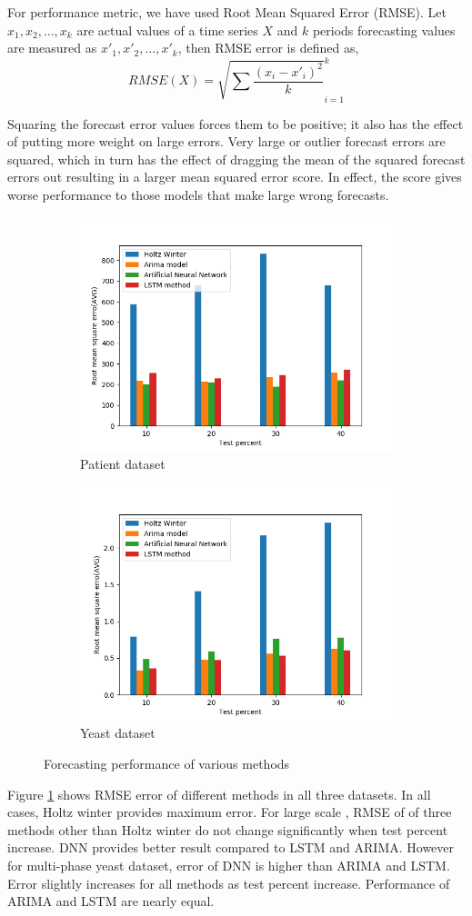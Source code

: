 For performance metric, we have used Root Mean Squared Error (RMSE). Let $x_1, x_2, \dots ,x_k$ are actual values of a time series $X$ and $k$ periods forecasting values are measured as $x'_1, x'_2, \dots ,x'_k$, then RMSE error is defined as,
\[ RMSE(X) = \sqrt{\sum{\frac{(x_i-x'_i)^2}{k}}}_{i=1}^{k}\]


Squaring the forecast error values forces them to be positive; it also has the effect of putting more weight on large errors.
Very large or outlier forecast errors are squared, which in turn has the effect of dragging the mean of the squared forecast errors out resulting in a larger mean squared error score. In effect, the score gives worse performance to those models that make large wrong forecasts.

\begin{figure}[]
	\centering
	\begin{subfigure}{0.5\columnwidth}
		\centering
		\includegraphics[width=\columnwidth, height=4 cm]{Figures/patient_forecast_rmse.png}
		\caption{Patient dataset}
	\end{subfigure}%
	\begin{subfigure}{0.5\columnwidth}
		\centering
			\includegraphics[width=\columnwidth, height=4 cm]{Figures/yeast_forecast_rmse.png}
		\caption{Yeast dataset}
	\end{subfigure}%
	\caption{Forecasting performance of various methods}
	\label{fig-forecast}
\end{figure}

Figure \ref{fig-forecast} shows RMSE error of different methods in all three
datasets. In all cases, Holtz winter provides maximum error.
For large scale , RMSE of of three methods other than Holtz winter do not
change significantly when test percent increase. DNN provides better result
compared to LSTM and ARIMA.
However for multi-phase yeast dataset, error of DNN is higher than
ARIMA and LSTM. Error slightly increases for all methods as test percent
increase. Performance of ARIMA and LSTM are nearly equal.